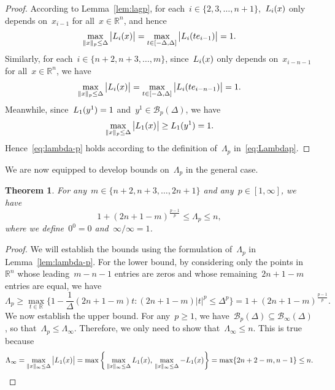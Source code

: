 \documentclass[draft]{article}
\numberwithin{equation}{section}
\theoremstyle{definition}
\theoremstyle{plain}
\newtheorem{theorem}{Theorem}[section]
\theoremstyle{remark}
\newcommand*{\abs}[2][]{#1\lvert#2#1\rvert}
\newcommand*{\lagp}[1][]{L\ifblank{#1}{}{_{#1}}}
\newcommand*{\norm}[2][]{#1\lVert#2#1\rVert}
\newcommand*{\R}{\mathbb{R}}
\newcommand*{\set}[2][]{#1\{#2#1\}}
\begin{document}
\begin{proof}
    According to Lemma~\ref{lem:lagp}, for each~$i \in \set{2, 3, \dots, n + 1}$,~$\lagp[i](x)$ only depends on~$x_{i - 1}$ for all~$x \in \R^n$, and hence
    \begin{equation*}
        \max_{\norm{x}_p \le \Delta} \abs[\big]{\lagp[i](x)} = \max_{t \in [-\Delta, \Delta]} \abs[\big]{\lagp[i](t e_{i - 1})} = 1.
    \end{equation*}
    Similarly, for each~$i \in \set{n + 2, n + 3, \dots, m}$, since~$\lagp[i](x)$ only depends on~$x_{i - n - 1}$ for all~$x \in \R^n$, we have
    \begin{equation*}
        \max_{\norm{x}_p \le \Delta} \abs[\big]{\lagp[i](x)} = \max_{t \in [-\Delta, \Delta]} \abs[\big]{\lagp[i](t e_{i - n - 1})} = 1.
    \end{equation*}
    Meanwhile, since~$\lagp[1](y^1) = 1$ and~$y^1 \in \mathcal{B}_p(\Delta)$, we have
    \begin{equation*}
        \max_{\norm{x}_p \le \Delta} \abs[\big]{\lagp[1](x)} \ge \lagp[1](y^1) = 1.
    \end{equation*}
    Hence~\eqref{eq:lambda-p} holds according to the definition of~$\Lambda_p$ in~\eqref{eq:Lambdap}.
\end{proof}

We are now equipped to develop bounds on~$\Lambda_p$ in the general case.

\begin{theorem}
    \label{thm:lambda-p}
    For any~$m \in \set{n + 2, n + 3, \dots, 2n + 1}$ and any~$p \in [1, \infty]$, we have
    \begin{equation*}
        1 + (2n + 1 - m)^{\frac{p - 1}{p}} \le \Lambda_p \le n,
    \end{equation*}
    where we define~$0^0 = 0$ and~$\infty/\infty = 1$.%
\end{theorem}

\begin{proof}
    We will establish the bounds using the formulation of~$\Lambda_p$ in Lemma~\ref{lem:lambda-p}.
    For the lower bound, by considering only the points in~$\R^n$ whose leading~$m - n - 1$ entries are zeros and whose remaining~$2n + 1 - m$ entries are equal, we have
    \begin{equation*}
        \Lambda_p \ge \max_{t \in \R} \set[\bigg]{1 - \frac{1}{\Delta} (2n + 1 - m) t : (2n + 1 - m) \abs{t}^p \le \Delta^p} = 1 + (2n + 1 - m)^{\frac{p - 1}{p}}.
    \end{equation*}
    We now establish the upper bound.
    For any~$p \ge 1$, we have~$\mathcal{B}_p(\Delta) \subseteq \mathcal{B}_{\infty}(\Delta)$, so that~$\Lambda_p \le \Lambda_{\infty}$.
    Therefore, we only need to show that~$\Lambda_{\infty} \le n$.
    This is true because
    \begin{equation*}
        \Lambda_{\infty} =
        \max_{\norm{x}_{\infty} \le \Delta} \abs[\big]{\lagp[1](x)}
        = \max\bigg\{\max_{\norm{x}_{\infty} \le \Delta} \lagp[1](x), \,\max_{\norm{x}_{\infty} \le \Delta} -\lagp[1](x) \bigg\}
        = \max \set{2n + 2 - m, n - 1} \le n.
    \end{equation*}
\end{proof}
\end{document}
